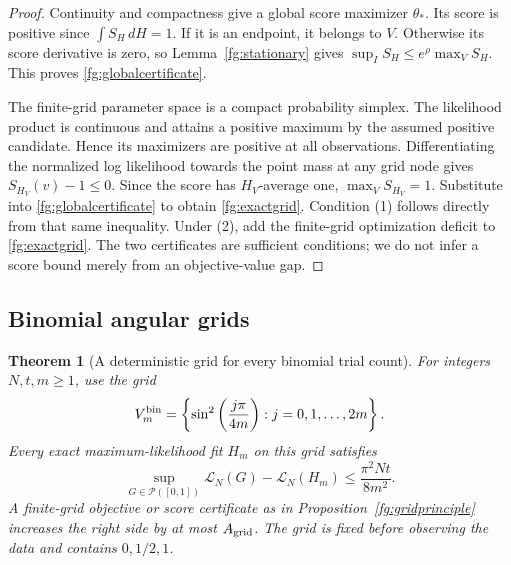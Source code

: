 \documentclass[11pt,a4paper]{article}
\newtheorem{theorem}{Theorem}[section]
\theoremstyle{definition}
\theoremstyle{remark}
\numberwithin{equation}{section}
\begin{document}
\begin{proof}
Continuity and compactness give a global score maximizer $\theta_*$.
Its score is positive since $\int S_H\,dH=1$. If it is an endpoint,
it belongs to $V$. Otherwise its score derivative is zero, so
Lemma~\ref{fg:stationary} gives
$\sup_I S_H\le e^\rho\max_VS_H$. This proves
\eqref{fg:globalcertificate}.

The finite-grid parameter space is a compact probability simplex.
The likelihood product is continuous and attains a positive maximum by
the assumed positive candidate. Hence its maximizers are positive at all
observations. Differentiating the normalized log likelihood towards
the point mass at any grid node gives $S_{H_V}(v)-1\le0$.
Since the score has $H_V$-average one, $\max_VS_{H_V}=1$.
Substitute into \eqref{fg:globalcertificate} to obtain
\eqref{fg:exactgrid}. Condition (1) follows directly from that same
inequality. Under (2), add the finite-grid optimization deficit to
\eqref{fg:exactgrid}. The two certificates are sufficient conditions;
we do not infer a score bound merely from an objective-value gap.
\end{proof}

\subsection{Binomial angular grids}

\begin{theorem}[A deterministic grid for every binomial trial count]
\label{fg:binomial}
For integers $N,t,m\ge1$, use the grid
\[
 V_m^{\rm bin}=
 \left\{\sin^2\left(\frac{j\pi}{4m}\right):j=0,1,\ldots,2m\right\}.
\]
Every exact maximum-likelihood fit $H_m$ on this grid satisfies
\begin{equation}\label{fg:bindeficit}
 \sup_{G\in\mathcal P([0,1])}\mathcal L_N(G)-\mathcal L_N(H_m)
                         \le\frac{\pi^2Nt}{8m^2}.
\end{equation}
A finite-grid objective or score certificate as in
Proposition~\ref{fg:gridprinciple} increases the right side by at most
$A_{\rm grid}$. The grid is fixed before observing the data and
contains $0,1/2,1$.
\end{theorem}
\end{document}
